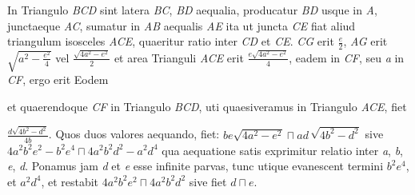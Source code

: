 \pstart
\noindent
In Triangulo
\textit{BCD} sint latera \textit{BC}, \textit{BD} aequalia, producatur \textit{BD} usque in \textit{A}, junctaeque \textit{AC}, sumatur in \textit{AB} aequalis \textit{AE} ita ut juncta \textit{CE} fiat aliud triangulum isosceles \textit{ACE}, quaeritur ratio inter \textit{CD} et \textit{CE}.
\pend
\pstart
{}
\textit{CG} erit $\displaystyle\frac{e}{2}$, \textit{AG} erit $\sqrt{a^2-\displaystyle\frac{e^2}{4}}$ 
vel $\displaystyle\frac{\sqrt{4a^2-e^2}}{2}$ 
et area Trianguli \textit{ACE} erit $\displaystyle\frac{e\sqrt{4a^2-e^2}}{4}$, eadem
in \textit{CF}, seu \textit{a} in \textit{CF}, ergo erit 
\pend
\pstart
Eodem
\rule[-3.1ex]{0pt}{4ex}%
et 
quaerendoque
\textit{CF} in Triangulo \textit{BCD}, uti quaesiveramus in Triangulo \textit{ACE}, fiet 
\rule[-1.8ex]{0pt}{5.4ex}%
$\displaystyle\frac{d\sqrt{4b^2-d^2}}{4b}$.
\pend
\pstart
Quos duos valores aequando, fiet: $be\sqrt{4a^2-e^2}\sqcap ad\,\sqrt{4b^2-d^2}$ sive $4a^2b^2e^2-b^2e^4\sqcap 4a^2b^2d^2-a^2d^4$\bracks{,} qua aequatione satis exprimitur relatio inter \textit{a}, \textit{b}, \textit{e}, \textit{d}.
\pend
\pstart
Ponamus jam \textit{d} et \textit{e} esse infinite parvas, tunc utique evanescent termini $b^2e^4$, et $a^2d^4$, et restabit $4a^2b^2e^2\sqcap 4a^2b^2d^2$ sive fiet $d\sqcap e$.

